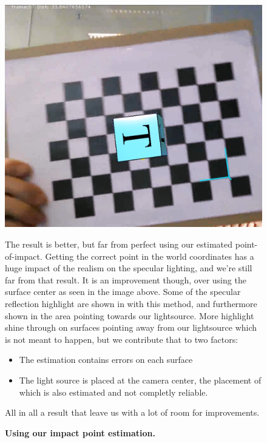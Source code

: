 \begin{figure}[H]
    \includegraphics{pics/EstimatedLight.png}
    \label{fig:EstimatedImpactPoint}
    \caption{\textbf{Using our impact point estimation.}}
     The result is better, but far from perfect using our estimated point-of-impact. Getting the correct point in the world coordinates has a huge impact of the realism on the specular lighting, and we're still far from that result. It is an improvement though, over using the surface center as seen in the image above. Some of the specular reflection highlight are shown in with this method, and furthermore shown in the area pointing towards our lightsource. More highlight shine through on surfaces pointing away from our lightsource which is not meant to happen, but we contribute that to two factors:
\begin{itemize}
\item{The estimation contains errors on each surface}
\item{The light source is placed at the camera center, the placement of which is also estimated and not completly reliable.}
\end{itemize}
All in all a result that leave us with a lot of room for improvements.
\end{figure}



